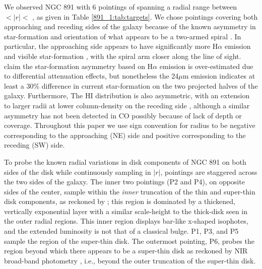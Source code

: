 We observed NGC 891 with 6 pointings of \GP spanning a radial range
between  $< \left|r\right| <$ ,
as given in Table \ref{891_1:tab:targets}. We chose pointings covering both
approaching and receding sides of the galaxy because of the known
asymmetry in star-formation and orientation of what appears to be a
two-armed spiral \citep{Xilouris99,Schechtman-Rook12}. In particular,
the approaching side appears to have significantly more H$\alpha$
emission and visible star-formation \citep{Rand90,Howk00,Kamphuis07a},
with the spiral arm closer along the line of sight. \cite{Kamphuis07b}
claim the star-formation asymmetry based on H$\alpha$ emission is
over-estimated due to differential attenuation effects, but
nonetheless the 24$\mu$m emission indicates at least a 30\% difference
in current star-formation on the two projected halves of the
galaxy. Furthermore, The HI distribution is also asymmetric, with an
extension to larger radii at lower column-density on the receding side
\citep{Swaters97,Oosterloo07}, although a similar asymmetry has not
been detected in CO \citep{Scoville93} possibly because of lack of
depth or coverage. Throughout this paper we use sign convention for
radius to be negative corresponding to the approaching (NE) side and
positive corresponding to the receding (SW) side.

To probe the known radial variations in disk components of NGC 891 on
both sides of the disk while continuously sampling in $|r|$, pointings
are staggered across the two sides of the galaxy. The inner two \GP
pointings (P2 and P4), on opposite sides of the center, sample within
the {\it inner} truncation of the thin and super-thin disk components,
as reckoned by \citet{Schechtman-Rook13}; this region is dominated by
a thickened, vertically exponential layer with a similar scale-height
to the thick-disk seen in the outer radial regions. This inner region
displays bar-like x-shaped isophotes, and the extended luminosity is
not that of a classical bulge. P1, P3, and P5 sample the region of the
super-thin disk. The outermost \GP pointing, P6, probes the region
beyond which there appears to be a super-thin disk as reckoned by NIR
broad-band photometry \citep{Schechtman-Rook12}, i.e., beyond the
outer truncation of the super-thin disk.

